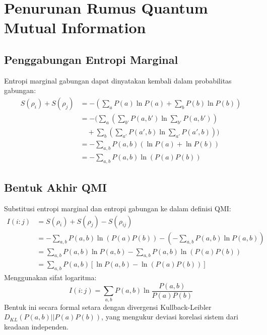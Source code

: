 \section{Penurunan Rumus Quantum Mutual Information}

\subsection{Penggabungan Entropi Marginal}
Entropi marginal gabungan dapat dinyatakan kembali dalam probabilitas gabungan:
\begin{equation}
\begin{aligned}
S(\rho_i) + S(\rho_j) &= -\left( \sum_{a} P(a) \ln P(a) + \sum_{b} P(b) \ln P(b) \right) \\
&= -\biggl( \sum_{a} \left( \sum_{b'} P(a, b') \ln \sum_{b'} P(a, b') \right) \\ &\quad + \sum_{b} \left( \sum_{a'} P(a', b) \ln \sum_{a'} P(a', b) \right) \biggr) \\
&= -\sum_{a, b} P(a, b) \left( \ln P(a) + \ln P(b) \right) \\
&= -\sum_{a, b} P(a, b) \ln \left( P(a) P(b) \right)
\end{aligned}
\end{equation}

\subsection{Bentuk Akhir QMI}
Substitusi entropi marginal dan entropi gabungan ke dalam definisi QMI:
\begin{equation}
\begin{aligned}
I(i:j) &= S(\rho_i) + S(\rho_j) - S(\rho_{ij}) \\
&= -\sum_{a, b} P(a, b) \ln \left( P(a) P(b) \right) - \left( -\sum_{a, b} P(a, b) \ln P(a, b) \right) \\
&= \sum_{a, b} P(a, b) \ln P(a, b) - \sum_{a, b} P(a, b) \ln \left( P(a) P(b) \right) \\
&= \sum_{a, b} P(a, b) \left[ \ln P(a, b) - \ln \left( P(a) P(b) \right) \right]
\end{aligned}
\end{equation}
Menggunakan sifat logaritma:
\begin{equation}
I(i:j) = \sum_{a, b} P(a, b) \ln \frac{P(a, b)}{P(a) P(b)}
\end{equation}
Bentuk ini secara formal setara dengan divergensi Kullback-Leibler $D_{KL}(P(a,b) || P(a)P(b))$, yang mengukur deviasi korelasi sistem dari keadaan independen.
